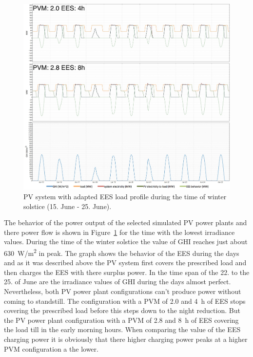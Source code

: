 \begin{figure}[!bhtp]  
\centering
\includegraphics[width=1\linewidth]{FIG/PV_winter_load}
\caption[PV system with adapted EES load profile during the time of winter solstice.]{PV system with adapted EES load profile during the time of winter solstice (15. June - 25. June).}\label{PV_winter_load}
\end{figure}
The behavior of the power output of the selected simulated PV power plants and there power flow is shown in Figure~\ref{PV_winter_load} for the time with the lowest irradiance values. During the time of the winter solstice the value of GHI reaches just about 630~W/m\textsuperscript{2} in peak. The graph shows the behavior of the EES during the days and as it was described above the PV system first covers the prescribed load and then charges the EES with there surplus power. In the time span of the 22. to the 25. of June are the irradiance values of GHI during the days almost perfect. Nevertheless, both PV power plant configurations can't produce power without coming to standstill. The configuration with a PVM of 2.0 and 4~h of EES stops covering the prescribed load before this steps down to the night reduction. But the PV power plant configuration with a PVM of 2.8 and 8~h of EES covering the load till in the early morning hours. When comparing the value of the EES charging power it is obviously that there higher charging power peaks at a higher PVM configuration a the lower. 

